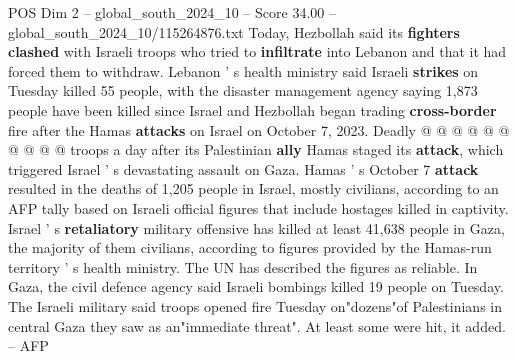 \begin{textsample}{POS Dim 2 – global\_south\_2024\_10 – Score 34.00 – global\_south\_2024\_10/115264876.txt}
Today, Hezbollah said its \textbf{fighters} \textbf{clashed} with Israeli troops who tried to \textbf{infiltrate} into Lebanon and that it had forced them to withdraw.
Lebanon ' s health ministry said Israeli \textbf{strikes} on Tuesday killed 55 people, with the disaster management agency saying 1,873 people have been killed since Israel and Hezbollah began trading \textbf{cross-border} fire after the Hamas \textbf{attacks} on Israel on October 7, 2023.
Deadly @ @ @ @ @ @ @ @ @ @ troops a day after its Palestinian \textbf{ally} Hamas staged its \textbf{attack}, which triggered Israel ' s devastating assault on Gaza.
Hamas ' s October 7 \textbf{attack} resulted in the deaths of 1,205 people in Israel, mostly civilians, according to an AFP tally based on Israeli official figures that include hostages killed in captivity.
Israel ' s \textbf{retaliatory} military offensive has killed at least 41,638 people in Gaza, the majority of them civilians, according to figures provided by the Hamas-run territory ' s health ministry.
The UN has described the figures as reliable.
In Gaza, the civil defence agency said Israeli bombings killed 19 people on Tuesday.
The Israeli military said troops opened fire Tuesday on"dozens"of Palestinians in central Gaza they saw as an"immediate threat".
At least some were hit, it added. -- AFP

\end{textsample}
